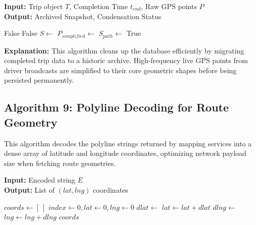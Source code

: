 \begin{algorithm}[H]
\caption{Automated Trip Archiving and Data Condensation}
\textbf{Input:} Trip object $T$, Completion Time $t_{end}$, Raw GPS points $P$ \\
\textbf{Output:} Archived Snapshot, Condensation Status
\begin{algorithmic}[1]
        \State \Return False 
    \EndIf
        \State \Return False
    \EndIf
    \State {}
    \State $S \gets$ 
    \State $P_{simplified} \gets$ 
    \State $S_{path} \gets$ 
    \State {}
    \State {}
    \State {}
    \State {}
    \State \Return True
\EndFunction
\end{algorithmic}
\end{algorithm}

\textbf{Explanation:} This algorithm cleans up the database efficiently by migrating completed trip data to a historic archive. High-frequency live GPS points from driver broadcasts are simplified to their core geometric shapes before being persisted permanently.

\subsection{Algorithm 9: Polyline Decoding for Route Geometry}

This algorithm decodes the polyline strings returned by mapping services into a dense array of latitude and longitude coordinates, optimizing network payload size when fetching route geometries.

\begin{algorithm}[H]
\small
\caption{Route Polyline Decoding (ORS/Google Format)}
\textbf{Input:} Encoded string $E$ \\
\textbf{Output:} List of $(lat, lng)$ coordinates
\begin{algorithmic}[1]
    \State $coords \gets [~]$
    \State $index \gets 0, lat \gets 0, lng \gets 0$
        \State $dlat \gets$ 
        \State $lat \gets lat + dlat$
        \State $dlng \gets$ 
        \State $lng \gets lng + dlng$
        \State {}
    \EndWhile
    \State \Return $coords$
\EndFunction
\end{algorithmic}
\end{algorithm}

